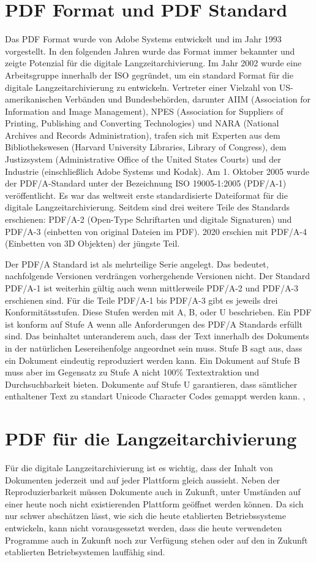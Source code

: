 \documentclass[a4paper,oneside, 12pt]{report}
\begin{document}
\section{PDF Format und PDF Standard}
Das PDF Format wurde von Adobe Systems entwickelt und im Jahr 1993 vorgestellt. In den folgenden Jahren wurde das Format immer bekannter und zeigte Potenzial für die digitale Langzeitarchivierung. Im Jahr 2002 wurde eine Arbeitsgruppe innerhalb der \ac{ISO} gegründet, um ein standard Format für die digitale Langzeitarchivierung zu entwickeln. Vertreter einer Vielzahl von US-amerikanischen Verbänden und Bundesbehörden, darunter AIIM (Association for Information and Image Management), NPES (Association for Suppliers of Printing, Publishing and Converting Technologies) und NARA (National Archives and Records Administration), trafen sich mit Experten aus dem Bibliothekswesen (Harvard University Libraries, Library of Congress), dem Justizsystem (Administrative Office of the United States Courts) und der Industrie (einschließlich Adobe Systems und Kodak). Am 1. Oktober 2005 wurde der PDF/A-Standard unter der Bezeichnung ISO 19005-1:2005 (PDF/A-1) veröffentlicht. Es war das weltweit erste standardisierte Dateiformat für die digitale Langzeitarchivierung. Seitdem sind drei weitere Teile des Standards erschienen: PDF/A-2 (Open-Type Schriftarten und digitale Signaturen) und PDF/A-3 (einbetten von original Dateien im PDF). 2020 erschien mit PDF/A-4 (Einbetten von 3D Objekten) der jüngste Teil. \cite{pdfhist}

Der PDF/A Standard ist als mehrteilige Serie angelegt. Das bedeutet, nachfolgende Versionen verdrängen vorhergehende Versionen nicht. Der Standard PDF/A-1 ist weiterhin gültig auch wenn mittlerweile PDF/A-2 und PDF/A-3 erschienen sind. Für die Teile PDF/A-1 bis PDF/A-3 gibt es jeweils drei Konformitätsstufen. Diese Stufen werden mit A, B, oder U beschrieben. Ein PDF ist konform auf Stufe A wenn alle Anforderungen des PDF/A Standards erfüllt sind. Das beinhaltet unteranderem auch, dass der Text innerhalb des Dokuments in der natürlichen Lesereihenfolge angeordnet sein muss. Stufe B sagt aus, dass ein Dokument eindeutig reproduziert werden kann. Ein Dokument auf Stufe B muss aber im Gegensatz zu Stufe A nicht 100\% Textextraktion und Durchsuchbarkeit bieten. Dokumente auf Stufe U garantieren, dass sämtlicher enthaltener Text zu standart Unicode Character Codes gemappt werden kann. \cite{pdfhist}, \cite{pdftools}


\section{PDF für die Langzeitarchivierung}
Für die digitale Langzeitarchivierung ist es wichtig, dass der Inhalt von Dokumenten jederzeit und auf jeder Plattform gleich aussieht. Neben der Reproduzierbarkeit müssen Dokumente auch in Zukunft, unter Umständen auf einer heute noch nicht existierenden Plattform geöffnet werden können. Da sich nur schwer abschätzen lässt, wie sich die heute etablierten Betriebssysteme entwickeln, kann nicht vorausgessetzt werden, dass die heute verwendeten Programme auch in Zukunft noch zur Verfügung stehen oder auf den in Zukunft etablierten Betriebsystemen lauffähig sind.
\end{document}
